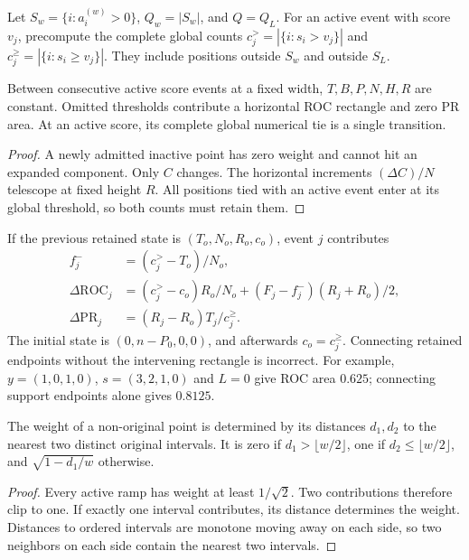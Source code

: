 Let $S_w=\{i:a_i^{(w)}>0\}$, $Q_w=|S_w|$, and $Q=Q_L$. For an active event
with score $v_j$, precompute the complete global counts
$c_j^>=|\{i:s_i>v_j\}|$ and $c_j^\ge=|\{i:s_i\ge v_j\}|$. They include
positions outside $S_w$ and outside $S_L$.

\begin{lemma}
Between consecutive active score events at a fixed width, $T,B,P,N,H,R$
are constant. Omitted thresholds contribute a horizontal ROC rectangle and
zero PR area. At an active score, its complete global numerical tie is a
single transition.
\end{lemma}
\begin{proof}
A newly admitted inactive point has zero weight and cannot hit an expanded
component. Only $C$ changes. The horizontal increments
$(\Delta C)/N$ telescope at fixed height $R$. All positions tied with an
active event enter at its global threshold, so both counts must retain them.
\end{proof}

If the previous retained state is $(T_o,N_o,R_o,c_o)$, event $j$ contributes
\begin{align}
 f_j^-&=(c_j^>-T_o)/N_o,\\
 \Delta\mathrm{ROC}_j&=
 (c_j^>-c_o)R_o/N_o+(F_j-f_j^-)(R_j+R_o)/2,\\
 \Delta\mathrm{PR}_j&=(R_j-R_o)T_j/c_j^\ge.
\end{align}
The initial state is $(0,n-P_0,0,0)$, and afterwards $c_o=c_j^\ge$.
Connecting retained endpoints without the intervening rectangle is
incorrect. For example, $y=(1,0,1,0)$, $s=(3,2,1,0)$ and $L=0$ give ROC
area $0.625$; connecting support endpoints alone gives $0.8125$.

\begin{lemma}
The weight of a non-original point is determined by its distances $d_1,d_2$
to the nearest two distinct original intervals. It is zero if
$d_1>\lfloor w/2\rfloor$, one if $d_2\le\lfloor w/2\rfloor$, and
$\sqrt{1-d_1/w}$ otherwise.
\end{lemma}
\begin{proof}
Every active ramp has weight at least $1/\sqrt2$. Two contributions therefore
clip to one. If exactly one interval contributes, its distance determines
the weight. Distances to ordered intervals are monotone moving away on each
side, so two neighbors on each side contain the nearest two intervals.
\end{proof}

